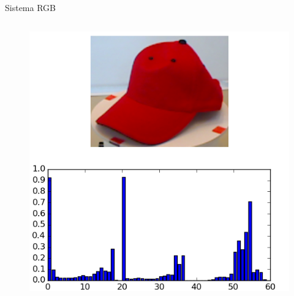 \documentclass[]{beamer}
\begin{document}
\begin{frame}{Sistema RGB}
\begin{columns}
\begin{column}{5cm}
{\begin{center}
                \end{center}
                \begin{figure}[t]
                	\centering
                    \vspace{-15pt}
                	\includegraphics[width=\textwidth]{img/template_histogram.png}
                \end{figure}
            }
        \end{column}

    \end{columns}

\end{frame}
\end{document}
